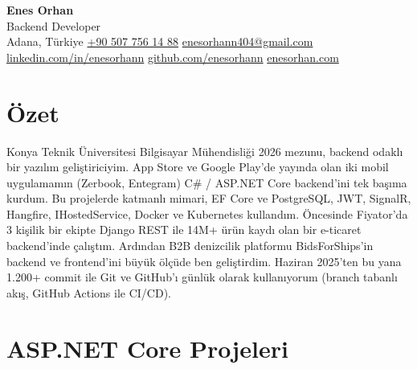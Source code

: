 \documentclass[10pt,a4paper]{extarticle}
\newcommand{\sep}{\;\textperiodcentered\;}
\begin{document}
\begin{center}
{\fontsize{23}{27}\selectfont\bfseries\color{accent}Enes Orhan}\\[4pt]
{\large\color{muted}Backend Developer}\;{\color{rulecol}\textbar}\\[6pt]
{\small
Adana, Türkiye\sep
\href{tel:+905077561488}{+90 507 756 14 88}\sep
\href{mailto:enesorhann404@gmail.com}{enesorhann404@gmail.com}\\[1pt]
\href{https://linkedin.com/in/enesorhann}{linkedin.com/in/enesorhann}\sep
\href{https://github.com/enesorhann}{github.com/enesorhann}\sep
\href{https://enesorhan.com}{enesorhan.com}}
\end{center}

\section{Özet}
Konya Teknik Üniversitesi Bilgisayar Mühendisliği 2026 mezunu, backend odaklı bir yazılım geliştiriciyim. App Store ve Google Play'de
yayında olan iki mobil uygulamamın (Zerbook, Entegram) C\# / ASP.NET Core backend'ini tek başıma kurdum. Bu projelerde katmanlı mimari, EF Core ve
PostgreSQL, JWT, SignalR, Hangfire, IHostedService, Docker ve Kubernetes kullandım. Öncesinde Fiyator'da 3 kişilik bir ekipte
Django REST ile 14M+ ürün kaydı olan bir e-ticaret backend'inde çalıştım. Ardından B2B denizcilik platformu BidsForShips'in
backend ve frontend'ini büyük ölçüde ben geliştirdim. Haziran 2025'ten bu yana 1.200+ commit ile Git ve GitHub'ı günlük olarak
kullanıyorum (branch tabanlı akış, GitHub Actions ile CI/CD).

\section{ASP.NET Core Projeleri}
\end{document}
